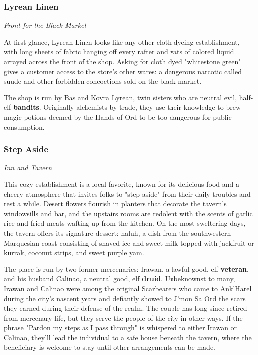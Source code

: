 \documentclass[letterpaper, 11pt, bg=full, twocolumn]{dndbook}
\begin{document}
\subsubsection{Lyrean Linen}

\textit{Front for the Black Market}

At first glance, Lyrean Linen looks like any other cloth-dyeing establishment, with long sheets of fabric hanging off every rafter and vats of colored liquid arrayed across the front of the shop. Asking for cloth dyed "whitestone green" gives a customer access to the store's other wares: a dangerous narcotic called suude and other forbidden concoctions sold on the black market.

The shop is run by Bas and Kovra Lyrean, twin sisters who are neutral evil, half-elf \textbf{bandits}. Originally alchemists by trade, they use their knowledge to brew magic potions deemed by the Hands of Ord to be too dangerous for public consumption.

\subsubsection{Step Aside}

\textit{Inn and Tavern}

This cozy establishment is a local favorite, known for its delicious food and a cheery atmosphere that invites folks to "step aside" from their daily troubles and rest a while. Desert flowers flourish in planters that decorate the tavern's windowsills and bar, and the upstairs rooms are redolent with the scents of garlic rice and fried meats wafting up from the kitchen. On the most sweltering days, the tavern offers its signature dessert: haluh, a dish from the southwestern Marquesian coast consisting of shaved ice and sweet milk topped with jackfruit or kurrak, coconut strips, and sweet purple yam.

The place is run by two former mercenaries: Irawan, a lawful good, elf \textbf{veteran}, and his husband Calinao, a neutral good, elf \textbf{druid}. Unbeknownst to many, Irawan and Calinao were among the original Scarbearers who came to Ank'Harel during the city's nascent years and defiantly showed to J'mon Sa Ord the scars they earned during their defense of the realm. The couple has long since retired from mercenary life, but they serve the people of the city in other ways. If the phrase "Pardon my steps as I pass through" is whispered to either Irawan or Calinao, they'll lead the individual to a safe house beneath the tavern, where the beneficiary is welcome to stay until other arrangements can be made.
\end{document}
